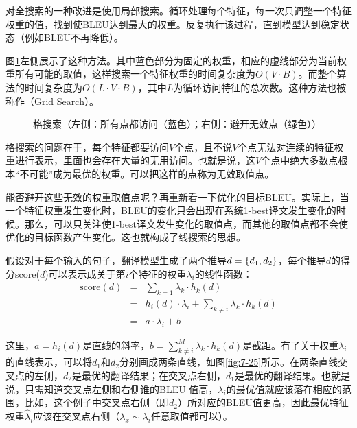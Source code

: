 \parinterval 对全搜索的一种改进是使用局部搜索。循环处理每个特征，每一次只调整一个特征权重的值，找到使BLEU达到最大的权重。反复执行该过程，直到模型达到稳定状态（例如BLEU不再降低）。

\parinterval 图\ref{fig:7-24}左侧展示了这种方法。其中蓝色部分为固定的权重，相应的虚线部分为当前权重所有可能的取值，这样搜索一个特征权重的时间复杂度为$O(V \cdot B)$。而整个算法的时间复杂度为$O(L \cdot V \cdot B)$，其中$L$为循环访问特征的总次数。这种方法也被称作{\small{}}（Grid Search）。

\begin{figure}[htp]
\centering

\caption{格搜索（左侧：所有点都访问（蓝色）；右侧：避开无效点（绿色））}
\label{fig:7-24}
\end{figure}

\parinterval 格搜索的问题在于，每个特征都要访问$V$个点，且不说$V$个点无法对连续的特征权重进行表示，里面也会存在大量的无用访问。也就是说，这$V$个点中绝大多数点根本“不可能”成为最优的权重。可以把这样的点称为无效取值点。

\parinterval 能否避开这些无效的权重取值点呢？再重新看一下优化的目标BLEU。实际上，当一个特征权重发生变化时，BLEU的变化只会出现在系统1-best译文发生变化的时候。那么，可以只关注使1-best译文发生变化的取值点，而其他的取值点都不会使优化的目标函数产生变化。这也就构成了线搜索的思想。

\parinterval 假设对于每个输入的句子，翻译模型生成了两个推导${d} = \{d_1,d_2\}$，每个推导$d$的得分score($d$)可以表示成关于第$i$个特征的权重$\lambda_i$的线性函数：
\begin{eqnarray}
\textrm{score}(d) &=& \sum_{k=1} \lambda_k \cdot h_k (d) \nonumber \\
&=& h_i (d) \cdot \lambda_i + \sum_{k \neq i} \lambda_k \cdot h_k (d) \nonumber \\
&=& a \cdot \lambda_i + b
\label{eq:7-20}
\end{eqnarray}

\parinterval 这里，$a = h_i(d)$是直线的斜率，$b = \sum_{k \neq i}^{M} \lambda_k \cdot h_k (d)$是截距。有了关于权重$\lambda_i$的直线表示，可以将$d_1$和$d_2$分别画成两条直线，如图\ref{fig:7-25}所示。在两条直线交叉点的左侧，$d_2$是最优的翻译结果；在交叉点右侧，$d_1$是最优的翻译结果。也就是说，只需知道交叉点左侧和右侧谁的BLEU 值高，$\lambda_i$的最优值就应该落在相应的范围，比如，这个例子中交叉点右侧（即$d_2$）所对应的BLEU值更高，因此最优特征权重$\hat{\lambda}_i$应该在交叉点右侧（$\lambda_x \sim \lambda_i$任意取值都可以）。

